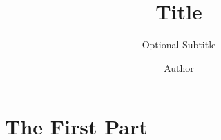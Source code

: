 \documentclass[a4paper, british]{memoir}
\title{Title}
\subtitle{Optional Subtitle}
\author{Author}
\begin{document}
    \frontmatter        %

    \masterfrontpage

    
    

    \cleartorecto
    \tableofcontents    %
    \cleartorecto
    \listoffigures      %
    \cleartorecto
    \listoftables       %

    \mainmatter         %

    

    \part{The First Part}

    
    
    

    \appendix           %
    \appendixpage       %

    
    

    \backmatter         %

    \printbibliography
\end{document}
